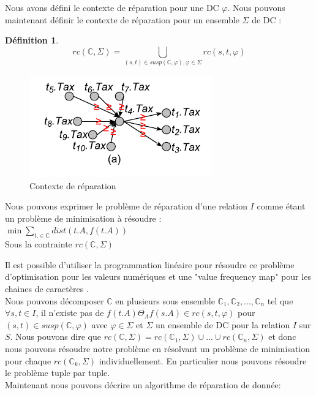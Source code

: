 \documentclass[letterpaper, 12pt]{report}
\theoremstyle{definition}
\newtheorem{mydef}{Définition}
\newcommand{\C}{\mathbb{C}}
\begin{document}
Nous avons défini le contexte de réparation pour une DC $\varphi$. Nous pouvons maintenant définir le contexte de réparation pour un ensemble $\Sigma$ de DC : 
\begin{mydef}
	$$rc(\mathbb{C},\Sigma) = \bigcup_{(s,t) \in susp(\mathbb{C},\varphi), \varphi \in  \Sigma} rc(s,t,\varphi)$$
\end{mydef}

\begin{figure}
\centering
\includegraphics[scale=1]{img/context.png}
\caption{\label{context} Contexte de réparation}
\end{figure}

Nous pouvons exprimer le problème de réparation d'une relation $I$ comme étant un problème de minimisation à résoudre : \\

$\min \sum_{t. \in \mathbb{C}} dist(t.A,f(t.A))$ \\
Sous la contrainte $ rc(\mathbb{C} , \Sigma)$

Il est possible d'utiliser la programmation linéaire pour résoudre ce problème d'optimisation pour les valeurs numériques et une "value frequency map" pour les chaines de caractères \cite{main}.\\

Nous pouvons décomposer $\C$ en plusieurs sous ensemble $\C_1 , \C_2,...,\C_n$ tel que $\forall s,t \in I$, il n'existe pas de $f(t.A) \overline{\Theta_A} f(s.A) \in rc(s,t,\varphi)$ pour $(s,t) \in susp(\C,\varphi)$ avec $\varphi \in \Sigma$ et $\Sigma$ un ensemble de DC pour la relation $I$ sur $S$. Nous pouvons dire que $rc(\C,\Sigma) = rc(\C_1,\Sigma) \cup ... \cup rc(\C_n,\Sigma) $ et donc nous pouvons résoudre notre problème en résolvant un problème de minimisation pour chaque $rc(\C_k , \Sigma)$ individuellement. En particulier nous pouvons résoudre le problème tuple par tuple.\\

Maintenant nous pouvons décrire un algorithme de réparation de donnée:
\end{document}
